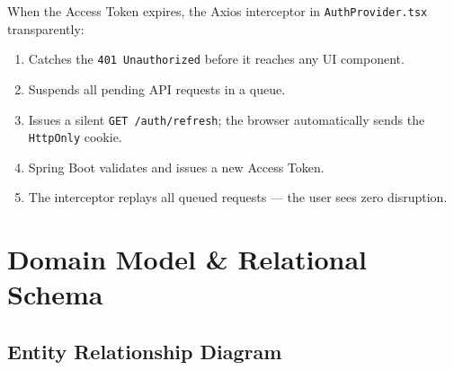 \documentclass[12pt,a4paper]{report}
\begin{document}
When the Access Token expires, the Axios interceptor in \texttt{AuthProvider.tsx} transparently:
\begin{enumerate}[label=\arabic*.]
  \item Catches the \texttt{401 Unauthorized} before it reaches any UI component.
  \item Suspends all pending API requests in a queue.
  \item Issues a silent \texttt{GET /auth/refresh}; the browser automatically sends the \texttt{HttpOnly} cookie.
  \item Spring Boot validates and issues a new Access Token.
  \item The interceptor replays all queued requests — the user sees zero disruption.
\end{enumerate}

\section{Domain Model \& Relational Schema}

\subsection{Entity Relationship Diagram}
\end{document}
